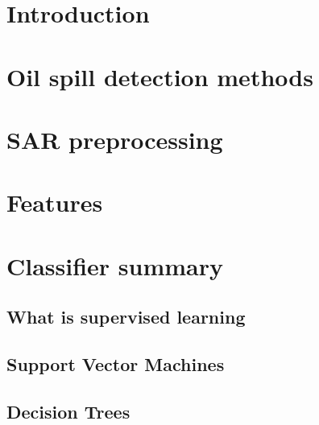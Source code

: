 \documentclass{article}
\begin{document}
\begin{multicols}{2} %

\section{Introduction}

  


\section{Oil spill detection methods}

	

\section{SAR preprocessing}

	

\section{Features}
	
	


\section{Classifier summary}

\subsection{What is supervised learning}

	

\subsection{Support Vector Machines}

	

\subsection{Decision Trees}


\end{multicols}
\end{document}
